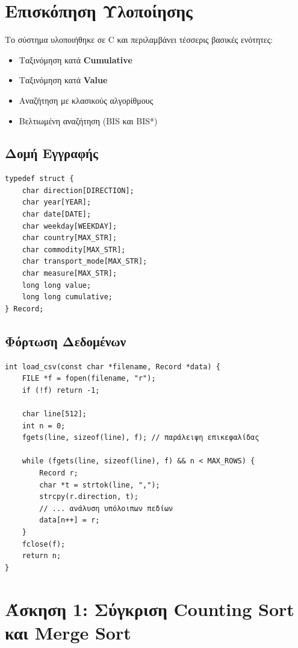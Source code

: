 \documentclass[a4paper,12pt]{article}
\begin{document}
	\newpage
	\section{Επισκόπηση Υλοποίησης}
	
	Το σύστημα υλοποιήθηκε σε C και περιλαμβάνει τέσσερις βασικές ενότητες:
	
	\begin{itemize}
		\item Ταξινόμηση κατά \textbf{Cumulative}
		\item Ταξινόμηση κατά \textbf{Value}
		\item Αναζήτηση με κλασικούς αλγορίθμους
		\item Βελτιωμένη αναζήτηση (BIS και BIS*)
	\end{itemize}
	
	\subsection{Δομή Εγγραφής}
	
	\begin{lstlisting}[caption=Δομή Record στη C]
typedef struct {
	char direction[DIRECTION];
	char year[YEAR];
	char date[DATE];
	char weekday[WEEKDAY];
	char country[MAX_STR];
	char commodity[MAX_STR];
	char transport_mode[MAX_STR];
	char measure[MAX_STR];
	long long value;
	long long cumulative;
} Record;
	\end{lstlisting}
	
	\subsection{Φόρτωση Δεδομένων}
	
	\begin{lstlisting}[caption=Φόρτωση CSV]
int load_csv(const char *filename, Record *data) {
	FILE *f = fopen(filename, "r");
	if (!f) return -1;
	
	char line[512];
	int n = 0;
	fgets(line, sizeof(line), f); // παράλειψη επικεφαλίδας
	
	while (fgets(line, sizeof(line), f) && n < MAX_ROWS) {
		Record r;
		char *t = strtok(line, ",");
		strcpy(r.direction, t);
		// ... ανάλυση υπόλοιπων πεδίων
		data[n++] = r;
	}
	fclose(f);
	return n;
}
	\end{lstlisting}
	
	\newpage
	\section{Άσκηση 1: Σύγκριση Counting Sort και Merge Sort}
	
\end{document}
